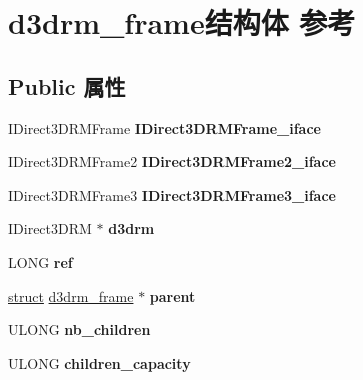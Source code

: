 \hypertarget{structd3drm__frame}{}\section{d3drm\+\_\+frame结构体 参考}
\label{structd3drm__frame}
\subsection*{Public 属性}
\begin{DoxyCompactItemize}
\item 
\mbox{\label{structd3drm__frame_a2efbf005e97276a099c346058c6d2fd5}} 
I\+Direct3\+D\+R\+M\+Frame {\bfseries I\+Direct3\+D\+R\+M\+Frame\+\_\+iface}
\item 
\mbox{\label{structd3drm__frame_a90ef1d8c610b408fce68d7529815bf87}} 
I\+Direct3\+D\+R\+M\+Frame2 {\bfseries I\+Direct3\+D\+R\+M\+Frame2\+\_\+iface}
\item 
\mbox{\label{structd3drm__frame_a16464fa35e2c33cf3796aea002e8accb}} 
I\+Direct3\+D\+R\+M\+Frame3 {\bfseries I\+Direct3\+D\+R\+M\+Frame3\+\_\+iface}
\item 
\mbox{\label{structd3drm__frame_a0885ff794297b8b7db6cc13e400875db}} 
I\+Direct3\+D\+RM $\ast$ {\bfseries d3drm}
\item 
\mbox{\label{structd3drm__frame_ac99c132ced84a004333c96b3c2a8e9a7}} 
L\+O\+NG {\bfseries ref}
\item 
\mbox{\label{structd3drm__frame_a71c78fd9db85cc55140e6378b1b78517}} 
\hyperlink{interfacestruct}{struct} \hyperlink{structd3drm__frame}{d3drm\+\_\+frame} $\ast$ {\bfseries parent}
\item 
\mbox{\label{structd3drm__frame_a35107195c718302bc5ae9814a1b5cb59}} 
U\+L\+O\+NG {\bfseries nb\+\_\+children}
\item 
\mbox{\label{structd3drm__frame_ad00239d032db5260d2544ec3a60ac8fd}} 
U\+L\+O\+NG {\bfseries children\+\_\+capacity}
\item 
\mbox{\label{structd3drm__frame_a29fa6443cf06903828e6d5e8cadee6b4}} 

\end{DoxyCompactItemize}

